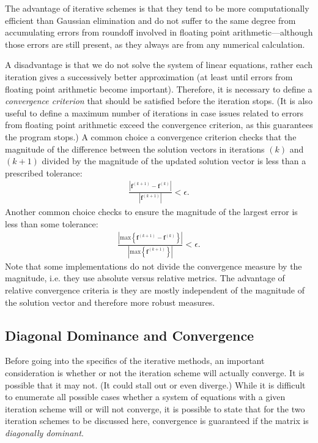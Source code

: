 The advantage of iterative schemes is that they tend to be more computationally efficient than Gaussian elimination and do not suffer to the same degree from accumulating errors from roundoff involved in floating point arithmetic---although those errors are still present, as they always are from any numerical calculation. 

A disadvantage is that we do not solve the system of linear equations, rather each iteration gives a successively better approximation (at least until errors from floating point arithmetic become important). Therefore, it is necessary to define a \emph{convergence criterion} that should be satisfied before the iteration stops. (It is also useful to define a maximum number of iterations in case issues related to errors from floating point arithmetic exceed the convergence criterion, as this guarantees the program stops.) A common choice a convergence criterion checks that the magnitude of the difference between the solution vectors in iterations $(k)$ and $(k+1)$ divided by the magnitude of the updated solution vector is less than a prescribed tolerance:
\begin{align}
  \frac{ \left| \mathbf{f}^{(k+1)} - \mathbf{f}^{(k)} \right| }{ \left| \mathbf{f}^{(k+1)} \right| } < \epsilon.
\end{align}
Another common choice checks to ensure the magnitude of the largest error is less than some tolerance:
\begin{align}
  \frac{ \left| \textrm{max} \left\{ \mathbf{f}^{(k+1)} - \mathbf{f}^{(k)} \right\} \right| }{ \left| \textrm{max} \left\{ \mathbf{f}^{(k+1)} \right\} \right| }  < \epsilon.
\end{align}
Note that some implementations do not divide the convergence measure by the magnitude, i.e. they use absolute versus relative metrics. The advantage of relative convergence criteria is they are mostly independent of the magnitude of the solution vector and therefore more robust measures.


\subsection{Diagonal Dominance and Convergence}

Before going into the specifics of the iterative methods, an important consideration is whether or not the iteration scheme will actually converge. It is possible that it may not. (It could stall out or even diverge.) While it is difficult to enumerate all possible cases whether a system of equations with a given iteration scheme will or will not converge, it is possible to state that for the two iteration schemes to be discussed here, convergence is guaranteed if the matrix is \emph{diagonally dominant}.

